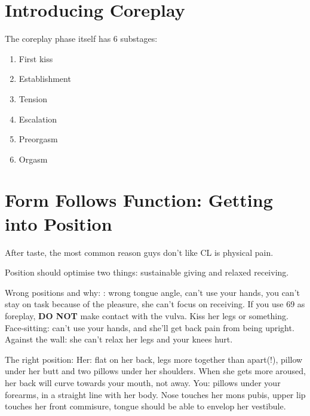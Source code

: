 \section{Introducing Coreplay}
The coreplay phase itself has 6 substages:
\begin{enumerate}
	\item First kiss
	\item Establishment
	\item Tension
	\item Escalation
	\item Preorgasm
	\item Orgasm
\end{enumerate}

\section{Form Follows Function: Getting into Position}
\begin{outline}
\1 After taste, the most common reason guys don't like CL is physical pain.

\1 Position should optimise two things: sustainable giving and relaxed receiving.

\1 Wrong positions and why:
	: wrong tongue angle, can't use your hands, you can't stay on task because of the pleasure, she can't focus on receiving. If you use 69 as foreplay, \textbf{DO NOT} make contact with the vulva. Kiss her legs or something.
	\2 Face-sitting: can't use your hands, and she'll get back pain from being upright.
	\2 Against the wall: she can't relax her legs and your knees hurt.

\1 The right position:
	\2 Her: flat on her back, legs more together than apart(!), pillow under her butt and two pillows under her shoulders. When she gets more aroused, her back will curve towards your mouth, not away.
	\2 You: pillows under your forearms, in a straight line with her body. Nose touches her mons pubis, upper lip touches her front commisure, tongue should be able to envelop her vestibule.
\end{outline}

